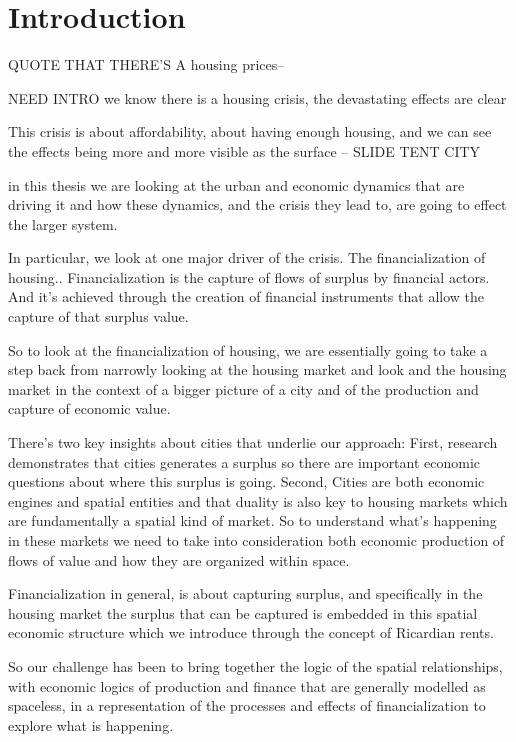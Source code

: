 
\section{Introduction}
QUOTE THAT THERE'S A housing prices--

NEED INTRO
we know there is a housing crisis, the devastating effects are clear 

This crisis is about affordability, about having enough housing, 
and we can see the effects being more and more visible as the surface -- SLIDE TENT CITY 

in this thesis we are looking at the urban and economic dynamics that are driving it and how  these dynamics, and the  crisis they lead to, are going to effect the larger system.

In particular, we look at one major driver of the crisis. The financialization of housing.. 
Financialization is the capture of flows of surplus by financial actors. And it's achieved through the creation of financial instruments that allow the capture of that surplus value. 

So to look at the financialization of housing,  we are essentially going to take a step back from narrowly looking at the housing market and look and the housing market in the context of a bigger picture of a city and of the production and capture of economic value.

There's two key insights about cities that underlie our approach: 
First, research demonstrates that cities  generates a surplus so there are important economic questions about where this surplus is going. 
Second, Cities are both economic engines and spatial entities and that duality is also key to housing markets which are fundamentally a spatial kind of market. So to understand what's happening in these markets we need to take into consideration both economic production of flows of value and how they are organized within space. 

Financialization in general, is about capturing surplus, and specifically in the housing market the surplus that can be captured is embedded in this spatial economic structure which we introduce through the concept of Ricardian rents. 

So our challenge has been to bring together the logic of the spatial relationships,  with economic logics of production and finance that are generally modelled as spaceless,  in a representation of the processes and effects of  financialization to explore  what is happening.

